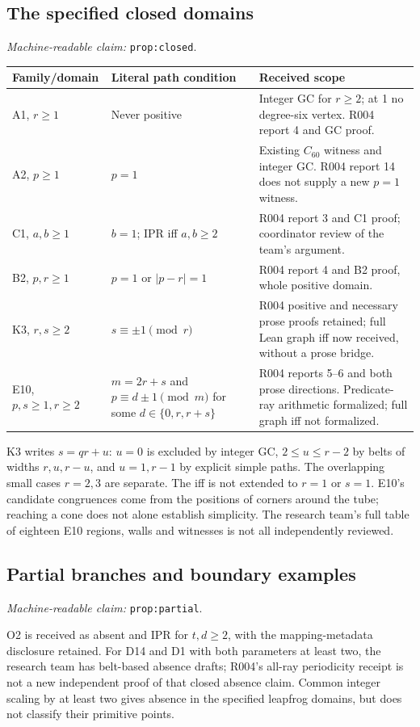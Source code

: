 \documentclass[11pt]{amsart}
\newcommand{\record}[1]{\nolinkurl{#1}}
\newcommand{\claimid}[1]{\par\nopagebreak\noindent\textit{Machine-readable claim:} \record{#1}.\par}
\theoremstyle{definition}\newtheorem{definition}{Definition}
\begin{document}
\subsection{The specified closed domains}\label{prop:closed}
\claimid{prop:closed}
\begin{center}\small
\begin{tabular}{p{}p{}p{}}\toprule
Family/domain & Literal path condition & Received scope\\\midrule
A1, $r\ge1$ & Never positive & Integer GC for $r\ge2$; at 1 no degree-six vertex. R004 report 4 and GC proof.\\
A2, $p\ge1$ & $p=1$ & Existing $C_{60}$ witness and integer GC. R004 report 14 does not supply a new $p=1$ witness.\\
C1, $a,b\ge1$ & $b=1$; IPR iff $a,b\ge2$ & R004 report 3 and C1 proof; coordinator review of the team's argument.\\
B2, $p,r\ge1$ & $p=1$ or $|p-r|=1$ & R004 report 4 and B2 proof, whole positive domain.\\
K3, $r,s\ge2$ & $s\equiv\pm1\pmod r$ & R004 positive and necessary prose proofs retained; full Lean graph iff now received, without a prose bridge.\\
E10, $p,s\ge1,r\ge2$ & $m=2r+s$ and $p\equiv d\pm1\pmod m$ for some $d\in\{0,r,r+s\}$ & R004 reports 5--6 and both prose directions. Predicate-ray arithmetic formalized; full graph iff not formalized.\\\bottomrule
\end{tabular}
\end{center}
K3 writes $s=qr+u$: $u=0$ is excluded by integer GC,
$2\le u\le r-2$ by belts of widths $r,u,r-u$, and $u=1,r-1$
by explicit simple paths. The overlapping small cases $r=2,3$ are
separate. The iff is not extended to $r=1$ or $s=1$. E10's candidate
congruences come from the positions of corners around the tube;
reaching a cone does not alone establish simplicity. The research
team's full table of eighteen E10 regions, walls and witnesses is not
all independently reviewed.

\subsection{Partial branches and boundary examples}\label{prop:partial}
\claimid{prop:partial}
O2 is received as absent and IPR for $t,d\ge2$, with the mapping-metadata
disclosure retained. For D14 and D1 with both parameters at least two,
the research team has belt-based absence drafts; R004's all-ray
periodicity receipt is not a new independent proof of that closed
absence claim. Common integer scaling by at least two gives absence
in the specified leapfrog domains, but does not classify their
primitive points.
\end{document}
